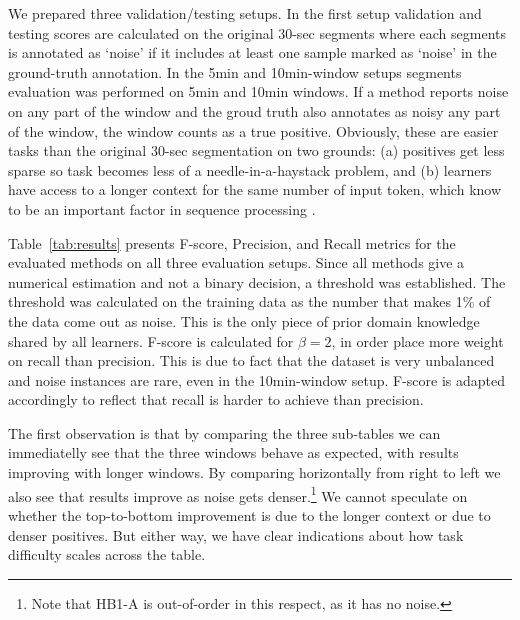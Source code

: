 \documentclass[conference]{IEEEtran}
\begin{document}
We prepared three validation/testing setups. In the first setup
validation and testing scores are calculated on the original 30-sec
segments where each segments is annotated as `noise' if it includes at
least one sample marked as `noise' in the ground-truth annotation.
In the 5min and 10min-window setups segments evaluation was performed
on 5min and 10min windows. If a method reports noise on any part of
the window and the groud truth also annotates as noisy any part of the
window, the window counts as a true positive. Obviously, these are
easier tasks than the original 30-sec segmentation on two
grounds: (a) positives get less sparse so task becomes less of a
needle-in-a-haystack problem, and (b) learners have access to a longer
context for the same number of input token, which know to be an
important factor in sequence processing \cite{Lee_2021}.



Table~\ref{tab:results} presents F-score, Precision, and Recall
metrics for the evaluated methods on all three evaluation setups.
%
Since all methods give a numerical estimation and not a binary
decision, a threshold was established. The threshold was calculated
on the training data as the number that makes 1\% of the data come out
as noise. This is the only piece of prior domain knowledge shared by
all learners.
%
F-score is calculated for $\beta=2$, in order
place more weight on recall than precision. This is due to fact that
the dataset is very unbalanced and noise instances are rare, even in
the 10min-window setup. F-score is adapted accordingly to reflect
that recall is harder to achieve than precision.


The first observation is that by comparing the three sub-tables we can
immediatelly see that the three windows behave as expected, with
results improving with longer windows. By comparing horizontally from
right to left we also see that results improve as noise gets
denser.\footnote{Note that HB1-A is out-of-order in this respect, as
  it has no noise.}
We cannot speculate on whether the top-to-bottom improvement
is due to the longer context or due to denser positives. But either
way, we have clear indications about how task difficulty scales across
the table.
\end{document}
